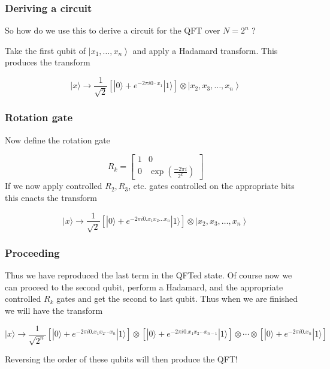 \documentclass{beamer}
\begin{document}
\begin{frame}
\frametitle{Deriving a circuit}

So how do we use this to derive a circuit for the QFT over $N=2^{n}$ ?

Take the first qubit of $\left|x_{1}, \ldots, x_{n}\right\rangle$ and
apply a Hadamard transform. This produces the transform

\begin{equation*}
|x\rangle \rightarrow \frac{1}{\sqrt{2}}\left[|0\rangle+e^{-2 \pi i 0 \cdot x_{1}}|1\rangle\right] \otimes\left|x_{2}, x_{3}, \ldots, x_{n}\right\rangle 
\end{equation*}
\end{frame}

\begin{frame}
\frametitle{Rotation gate}

Now define the rotation gate

\[
R_{k}=\left[\begin{array}{cc}
1 & 0  \tag{30}\\
0 & \exp \left(\frac{-2 \pi i}{2^{k}}\right)
\end{array}\right]
\]
If we now apply controlled $R_{2}, R_{3}$, etc. gates controlled on
the appropriate bits this enacts the transform

\begin{equation*}
|x\rangle \rightarrow \frac{1}{\sqrt{2}}\left[|0\rangle+e^{-2 \pi i 0 . x_{1} x_{2} \ldots x_{n}}|1\rangle\right] \otimes\left|x_{2}, x_{3}, \ldots, x_{n}\right\rangle 
\end{equation*}
\end{frame}

\begin{frame}
\frametitle{Proceeding}

Thus we have reproduced the last term in the QFTed state. Of course
now we can proceed to the second qubit, perform a Hadamard, and the
appropriate controlled $R_{k}$ gates and get the second to last
qubit. Thus when we are finished we will have the transform

\begin{equation*}
|x\rangle \rightarrow \frac{1}{\sqrt{2^{n}}}\left[|0\rangle+e^{-2 \pi i 0 . x_{1} x_{2} \cdots x_{n}}|1\rangle\right] \otimes\left[|0\rangle+e^{-2 \pi i 0 . x_{1} x_{2} \cdots x_{n-1}}|1\rangle\right] \otimes \cdots \otimes\left[|0\rangle+e^{-2 \pi i 0 . x_{n}}|1\rangle\right]
\end{equation*}

Reversing the order of these qubits will then produce the QFT!


\end{frame}
\end{document}

